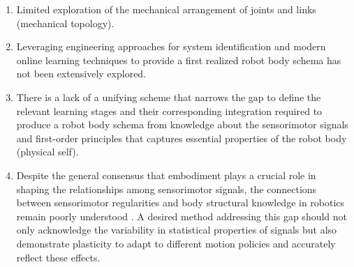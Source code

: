 \documentclass[12pt, a4paper]{article}
\newcommand{\redtext}[1]{\textcolor{red}{#1}}
\begin{document}
\begin{itemize}
\begin{enumerate}
		\item Limited exploration of the mechanical arrangement of joints and links (mechanical topology).

		\item Leveraging engineering approaches for system identification and modern online learning techniques to provide a first realized robot body schema has not been extensively explored.

		\item There is a lack of a unifying scheme that narrows the gap to define the relevant learning stages and their corresponding integration required to produce a robot body schema from  knowledge about the sensorimotor signals and first-order principles that captures essential properties of the robot body (physical self).

		\item Despite the general consensus that embodiment plays a crucial role in shaping the relationships among sensorimotor signals, the connections between sensorimotor regularities and body structural knowledge in robotics remain poorly understood \cite{Jacquey2019Sensorimotorcontingenciesas}. A desired method addressing this gap should not only acknowledge the variability in statistical properties of signals but also demonstrate plasticity to adapt to different motion policies and accurately reflect these effects.

		
	\end{enumerate}

	
\end{itemize}
\end{document}

